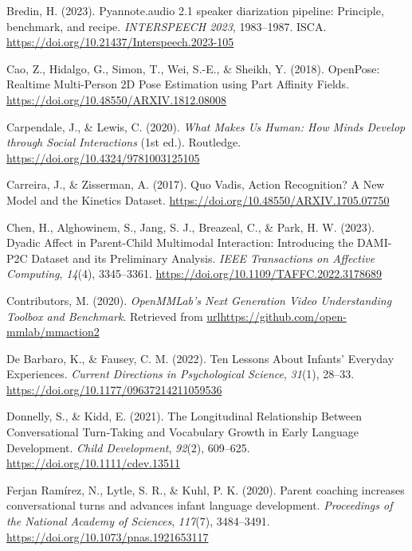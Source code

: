 \documentclass[
  man,floatsintext]{apa6}
\newlength{\cslhangindent}
\newenvironment{CSLReferences}[2] %
 {\begin{list}{}{%
  \setlength{\itemindent}{0pt}
  \setlength{\leftmargin}{0pt}
  \setlength{\parsep}{0pt}
  \ifodd #1
   \setlength{\leftmargin}{\cslhangindent}
   \setlength{\itemindent}{-1\cslhangindent}
  \fi
  \setlength{\itemsep}{#2\baselineskip}}}
 {\end{list}}
\begin{document}
\begin{CSLReferences}{1}{0}
Bredin, H. (2023). Pyannote.audio 2.1 speaker diarization pipeline: Principle, benchmark, and recipe. \emph{{INTERSPEECH} 2023}, 1983--1987. ISCA. \url{https://doi.org/10.21437/Interspeech.2023-105}

Cao, Z., Hidalgo, G., Simon, T., Wei, S.-E., \& Sheikh, Y. (2018). {OpenPose}: {Realtime Multi-Person 2D Pose Estimation} using {Part Affinity Fields}. \url{https://doi.org/10.48550/ARXIV.1812.08008}

Carpendale, J., \& Lewis, C. (2020). \emph{What {Makes Us Human}: {How Minds Develop} through {Social Interactions}} (1st ed.). Routledge. \url{https://doi.org/10.4324/9781003125105}

Carreira, J., \& Zisserman, A. (2017). Quo {Vadis}, {Action Recognition}? {A New Model} and the {Kinetics Dataset}. \url{https://doi.org/10.48550/ARXIV.1705.07750}

Chen, H., Alghowinem, S., Jang, S. J., Breazeal, C., \& Park, H. W. (2023). Dyadic {Affect} in {Parent-Child Multimodal Interaction}: {Introducing} the {DAMI-P2C Dataset} and its {Preliminary Analysis}. \emph{IEEE Transactions on Affective Computing}, \emph{14}(4), 3345--3361. \url{https://doi.org/10.1109/TAFFC.2022.3178689}

Contributors, M. (2020). \emph{{OpenMMLab}'s {Next Generation Video Understanding Toolbox} and {Benchmark}}. Retrieved from \url{urlhttps://github.com/open-mmlab/mmaction2}

De Barbaro, K., \& Fausey, C. M. (2022). Ten {Lessons About Infants}' {Everyday Experiences}. \emph{Current Directions in Psychological Science}, \emph{31}(1), 28--33. \url{https://doi.org/10.1177/09637214211059536}

Donnelly, S., \& Kidd, E. (2021). The {Longitudinal Relationship Between Conversational Turn}‐{Taking} and {Vocabulary Growth} in {Early Language Development}. \emph{Child Development}, \emph{92}(2), 609--625. \url{https://doi.org/10.1111/cdev.13511}

Ferjan Ramírez, N., Lytle, S. R., \& Kuhl, P. K. (2020). Parent coaching increases conversational turns and advances infant language development. \emph{Proceedings of the National Academy of Sciences}, \emph{117}(7), 3484--3491. \url{https://doi.org/10.1073/pnas.1921653117}


\end{CSLReferences}
\end{document}
